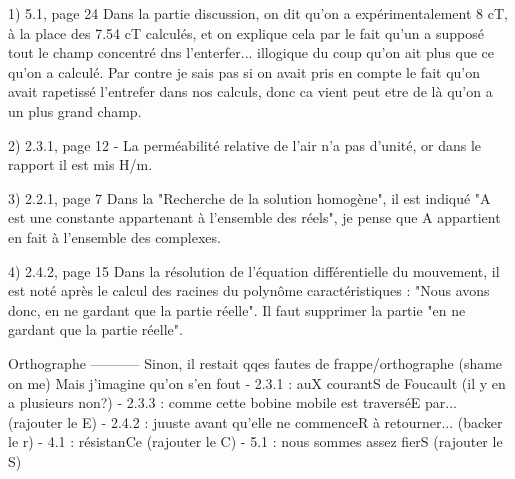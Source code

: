
1) 5.1, page 24
Dans la partie discussion, on dit qu'on a expérimentalement 8 cT, à la place des 7.54 cT calculés, et on explique 
cela par le fait qu'un a supposé tout le champ concentré dns l'enterfer... illogique du coup qu'on ait plus que ce qu'on a calculé.
Par contre je sais pas si on avait pris en compte le fait qu'on avait rapetissé l'entrefer dans nos calculs, donc ca vient peut
etre de là qu'on a un plus grand champ.

2) 2.3.1, page 12
- La perméabilité relative de l'air n'a pas d'unité, or dans le rapport il est mis H/m.

3) 2.2.1, page 7
Dans la "Recherche de la solution homogène", il est indiqué "A est une constante appartenant
à l'ensemble des réels", je pense que A appartient en fait à l'ensemble des complexes.

4) 2.4.2, page 15
Dans la résolution de l'équation différentielle du mouvement, il est noté après le calcul
des racines du polynôme caractéristiques : "Nous avons donc, en ne gardant que la partie réelle".
Il faut supprimer la partie "en ne gardant que la partie réelle".

Orthographe
-----------
Sinon, il restait qqes fautes de frappe/orthographe (shame on me) Mais j'imagine qu'on s'en fout
- 2.3.1 : auX courantS de Foucault (il y en a plusieurs non?)
- 2.3.3 : comme cette bobine mobile est traverséE par... (rajouter le E)
- 2.4.2 : juuste avant qu'elle ne commenceR à retourner... (backer le r)
- 4.1 : résistanCe (rajouter le C)
- 5.1 : nous sommes assez fierS (rajouter le S)

